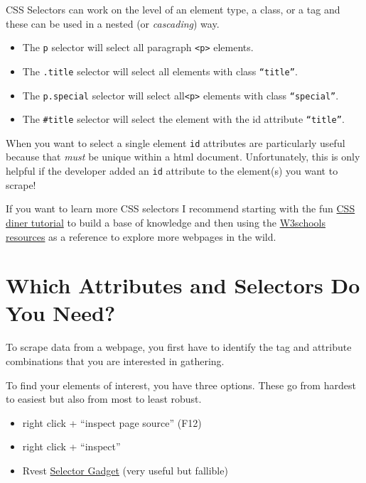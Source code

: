 \documentclass[
  letterpaper,
  DIV=11,
  numbers=noendperiod]{scrreprt}
\providecommand{\tightlist}{%
  \setlength{\itemsep}{0pt}\setlength{\parskip}{0pt}}\usepackage{longtable,booktabs,array}
\begin{document}
CSS Selectors can work on the level of an element type, a class, or a
tag and these can be used in a nested (or \emph{cascading}) way.

\begin{itemize}
\item
  The \texttt{p} selector will select all paragraph
  \texttt{\textless{}p\textgreater{}} elements.
\item
  The \texttt{.title} selector will select all elements with class
  \texttt{“title”}.
\item
  The \texttt{p.special} selector will select
  all\texttt{\textless{}p\textgreater{}} elements with class
  \texttt{“special”}.
\item
  The \texttt{\#title} selector will select the element with the id
  attribute \texttt{“title”}.
\end{itemize}

When you want to select a single element \texttt{id} attributes are
particularly useful because that \emph{must} be unique within a html
document. Unfortunately, this is only helpful if the developer added an
\texttt{id} attribute to the element(s) you want to scrape!

If you want to learn more CSS selectors I recommend starting with the
fun \href{https://flukeout.github.io/}{CSS diner tutorial} to build a
base of knowledge and then using the
\href{https://www.w3schools.com/css/default.asp}{W3schools resources} as
a reference to explore more webpages in the wild.

\section{Which Attributes and Selectors Do You
Need?}\label{which-attributes-and-selectors-do-you-need}

To scrape data from a webpage, you first have to identify the tag and
attribute combinations that you are interested in gathering.

To find your elements of interest, you have three options. These go from
hardest to easiest but also from most to least robust.

\begin{itemize}
\tightlist
\item
  right click + ``inspect page source'' (F12)
\item
  right click + ``inspect''
\item
  Rvest
  \href{https://rvest.tidyverse.org/articles/selectorgadget.html}{Selector
  Gadget} (very useful but fallible)
\end{itemize}
\end{document}
